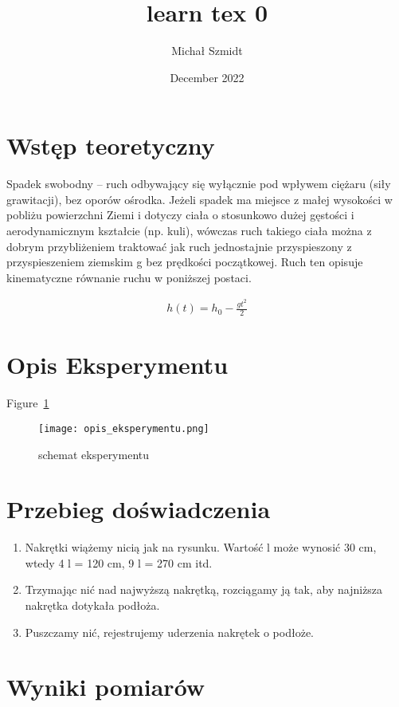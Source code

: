 \documentclass{article}
\title{learn tex 0}
\author{Michał Szmidt}
\date{December 2022}
\begin{document}
\maketitle

\section{Wstęp teoretyczny}
Spadek swobodny – ruch odbywający się wyłącznie pod wpływem ciężaru (siły grawitacji), bez oporów ośrodka. Jeżeli spadek ma miejsce z małej wysokości w pobliżu powierzchni Ziemi i dotyczy ciała o stosunkowo dużej gęstości i aerodynamicznym kształcie (np. kuli), wówczas ruch takiego ciała można z dobrym przybliżeniem traktować jak ruch jednostajnie przyspieszony z przyspieszeniem ziemskim g bez prędkości początkowej. Ruch ten opisuje kinematyczne równanie ruchu w poniższej postaci.

\begin{equation} \label{eq1}
\begin{split}
h\left(t\right)=h_0-\frac{gt^2}{2}
\end{split}
\end{equation}

\section{Opis Eksperymentu}

Figure~\ref{schemat eksperymentu}
\begin{figure}[!htbp]
\centering
\texttt{[image: opis\_eksperymentu.png]}
\caption{schemat eksperymentu}
\label{schemat eksperymentu}
\end{figure}

\section{Przebieg doświadczenia}

\begin{enumerate}
\item Nakrętki wiążemy nicią jak na rysunku. Wartość l może wynosić 30 cm, wtedy 4 l = 120 cm, 9 l = 270 cm itd.
\item Trzymając nić nad najwyższą nakrętką, rozciągamy ją tak, aby najniższa nakrętka dotykała podłoża.
\item Puszczamy nić, rejestrujemy uderzenia nakrętek o podłoże.
\end{enumerate}

\section{Wyniki pomiarów}
\end{document}
